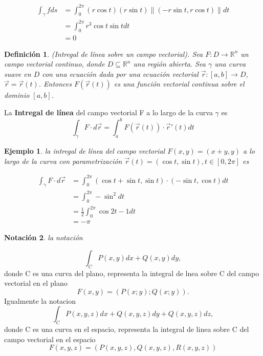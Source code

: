 \documentclass[11pt]{book}
\numberwithin{equation}{section}
\theoremstyle{plain}  %
\newtheorem{Def}{Definición}[chapter]
\newtheorem{Ej}{Ejemplo}[chapter]
\newtheorem{notacion}[Def]{Notación}
\providecommand{\norm}[1]{\lVert#1\rVert} %
\begin{document}
\begin{align*}
    \int_{\gamma} f ds &= \int_{0}^{2\pi} (r \cos{t})(r \sin{t})\norm{(-r \sin{t},r \cos{t})}dt \\
    &= \int_{0}^{2\pi} r^{3} \cos{t} \sin{t} dt \\
    &= 0
\end{align*}
\begin{Def}
(Intregal de línea sobre un campo vectorial). Sea $F: D \to \mathbb{R}^{n}$ un campo vectorial continuo, donde $D \subseteq \mathbb{R}^{n}$ una región abierta. Sea $\gamma$ una curva suave en $D$ con una ecuación dada por una ecuación vectorial $\vec{r}:[a,b] \to D$, $\vec{r}=\vec{r}(t)$. Entonces $F(\vec{r}(t))$ es una función vectorial continua sobre el dominio $[a,b]$.
\end{Def}
\noindent La \textbf{Intregal de línea} del campo vectorial F a lo largo de la curva $\gamma$ es 
\begin{equation*}
    \int_{\gamma} F \cdot d\vec{r} = \int_{a}^{b} F(\vec{r}(t)) \cdot \vec{r}'(t)dt
\end{equation*}

\begin{Ej}
la intregal de línea del campo vectorial $F(x,y)=(x+y,y)$ a lo largo de la curva con parametrización $\vec{r}(t)=(\cos{t},\sin{t}), t \in [0,2\pi]$ es 
\end{Ej}
\begin{align*}
\int_{\gamma} F \cdot d\vec{r} &= \int_{0}^{2\pi} (\cos{t} +\sin{t},\sin{t}) \cdot (- \sin{t}, \cos{t})dt \\
&= \int_{0}^{2 \pi} - \sin^{2} dt \\ 
&= \frac{1}{2} \int_{0}^{2 \pi} \cos{2t}-1dt \\ 
&= -\pi
\end{align*}
\begin{notacion}
la notación
\end{notacion}
\begin{equation*}
    \int_{C} P(x,y) dx + Q(x,y)dy,
\end{equation*}
\newpage
\noindent donde C es una curva del plano, representa la integral de lnea sobre C del campo vectorial en el plano
\begin{equation*}
	F(x,y) = (P(x; y);Q(x; y)).
\end{equation*}
\noindent Igualmente la notacion
\begin{equation*}
	\int_{C} P(x,y,z) dx + Q(x,y,z)dy + Q(x,y,z)dz,
\end{equation*}
\noindent donde C es una curva en el espacio, representa la integral de linea sobre C
del campo vectorial en el espacio
\begin{equation*}
	F(x, y, z) = (P(x, y, z),Q(x, y, z),R(x, y, z))
\end{equation*}
\end{document}
